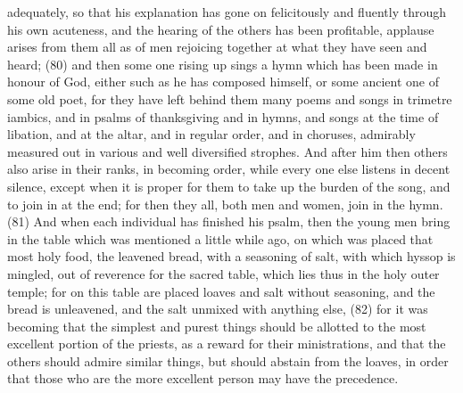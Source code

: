 adequately, so that his explanation has gone on felicitously and fluently through his own acuteness,
and the hearing of the others has been profitable, applause arises from them all as of men
rejoicing together at what they have seen and heard; (80) and then some one rising up sings a
hymn which has been made in honour of God, either such as he has composed himself, or some
ancient one of some old poet, for they have left behind them many poems and songs in trimetre
iambics, and in psalms of thanksgiving and in hymns, and songs at the time of libation, and at the
altar, and in regular order, and in choruses, admirably measured out in various and well diversified
strophes. And after him then others also arise in their ranks, in becoming order, while every one
else listens in decent silence, except when it is proper for them to take up the burden of the song,
and to join in at the end; for then they all, both men and women, join in the hymn. (81) And when
each individual has finished his psalm, then the young men bring in the table which was mentioned
a little while ago, on which was placed that most holy food, the leavened bread, with a seasoning of
salt, with which hyssop is mingled, out of reverence for the sacred table, which lies thus in the holy
outer temple; for on this table are placed loaves and salt without seasoning, and the bread is
unleavened, and the salt unmixed with anything else, (82) for it was becoming that the simplest and
purest things should be allotted to the most excellent portion of the priests, as a reward for their
ministrations, and that the others should admire similar things, but should abstain from the loaves,
in order that those who are the more excellent person may have the precedence.

